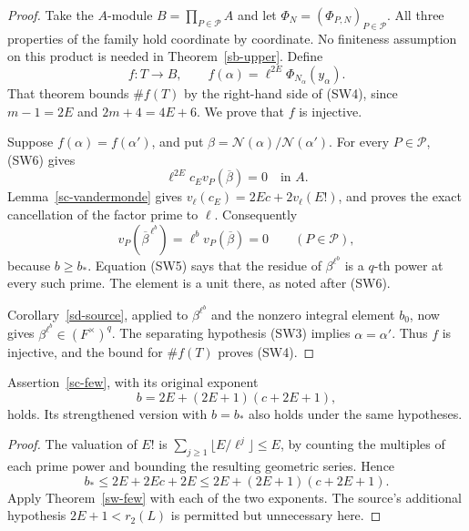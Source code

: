 \begin{proof}
Take the \(A\)-module
\(B=\prod_{P\in\mathcal P}A\) and let
\(\Phi_N=(\Phi_{P,N})_{P\in\mathcal P}\).
All three properties of the family hold
coordinate by coordinate.  No finiteness assumption
on this product is needed in Theorem~\ref{sb-upper}.
Define
\[
 f:T\longrightarrow B,
      \qquad f(\alpha)=\ell^{2E}\Phi_{N_\alpha}(y_\alpha).
 \tag{SW7}
\]
That theorem bounds \(\#f(T)\) by the right-hand side
of (SW4), since \(m-1=2E\) and \(2m+4=4E+6\).
We prove that \(f\) is injective.

Suppose \(f(\alpha)=f(\alpha')\), and put
\(\beta=\mathcal N(\alpha)/\mathcal N(\alpha')\).
For every \(P\in\mathcal P\), (SW6) gives
\[
                    \ell^{2E}c_E v_P(\overline\beta)=0
                                                \quad\text{in }A.
\]
Lemma~\ref{sc-vandermonde} gives
\(v_\ell(c_E)=2Ec+2v_\ell(E!)\), and proves the
exact cancellation of the factor prime to \(\ell\).
Consequently
\[
 v_P(\overline\beta^{\,\ell^b})
       =\ell^b v_P(\overline\beta)=0
                      \qquad(P\in\mathcal P),
\]
because \(b\ge b_*\).
Equation (SW5) says that the residue of
\(\beta^{\ell^b}\) is a \(q\)-th power at every
such prime.  The element is a unit there, as noted
after (SW6).

Corollary~\ref{sd-source}, applied to
\(\beta^{\ell^b}\) and the nonzero integral element
\(b_0\), now gives
\(\beta^{\ell^b}\in(F^\times)^q\).
The separating hypothesis (SW3) implies
\(\alpha=\alpha'\).  Thus \(f\) is injective, and
the bound for \(\#f(T)\) proves (SW4).
\end{proof}

\begin{corollary}\label{sw-source-few}
Assertion~\ref{sc-few}, with its original exponent
\[
                 b=2E+(2E+1)(c+2E+1),
\]
holds.  Its strengthened version with \(b=b_*\)
also holds under the same hypotheses.
\end{corollary}
\begin{proof}
The valuation of \(E!\) is
\(\sum_{j\ge1}\lfloor E/\ell^j\rfloor\le E\),
by counting the multiples of each prime power and
bounding the resulting geometric series.
Hence
\[
 b_*\le 2E+2Ec+2E
          \le 2E+(2E+1)(c+2E+1).
\]
Apply Theorem~\ref{sw-few} with each of the two
exponents.  The source's additional hypothesis
\(2E+1<r_2(L)\) is permitted but unnecessary here.
\end{proof}

